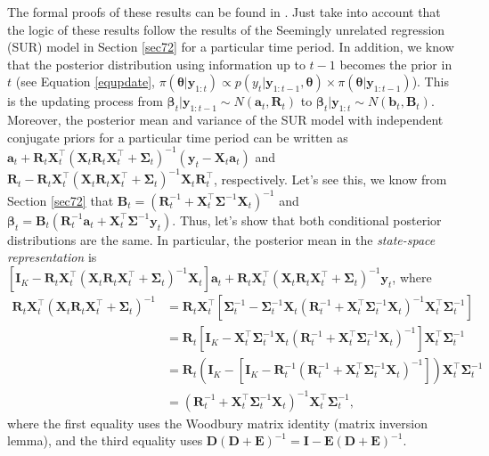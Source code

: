 The formal proofs of these results can be found in \cite[Chap~2]{petris2009dynamic}. Just take into account that the logic of these results follow the results of the Seemingly unrelated regression (SUR) model in Section \ref{sec72} for a particular time period. In addition, we know that the posterior distribution using information up to $t-1$ becomes the prior in $t$ (see Equation \ref{equpdate}, $\pi(\bm{\theta}|\mathbf{y}_{1:t})\propto p(y_{t}|\bm{y}_{1:t-1},\bm{\theta})\times \pi(\bm{\theta}|\bm{y}_{1:t-1})$). This is the updating process from  $\bm{\beta}_t|\bm{y}_{1:t-1}\sim N(\bm{a}_t, \bm{R}_t)$ to $\bm{\beta}_t|\bm{y}_{1:t}\sim N(\bm{b}_t, \bm{B}_t)$. Moreover, the posterior mean and variance of the SUR model with independent conjugate priors for a particular time period can be written as $\bm{a}_{t}+\bm{R}_{t}\bm{X}_t^{\top}(\bm{X}_t\bm{R}_{t}\bm{X}_t^{\top}+ \bm{\Sigma}_t)^{-1}(\bm{y}_t-\bm{X}_t\bm{a}_{t})$ and $\bm{R}_{t}-\bm{R}_{t}\bm{X}_t^{\top}(\bm{X}_t\bm{R}_{t}\bm{X}_t^{\top}+\bm{\Sigma}_t)^{-1} \bm{X}_t\bm{R}_{t}^{\top}$, respectively. Let's see this, we know from Section \ref{sec72} that $\bm{B}_t=(\bm{R}_t^{-1}+\bm{X}_t^{\top}\bm{\Sigma}^{-1}\bm{X}_t)^{-1}$ and $\bm{\beta}_t=\bm{B}_t(\bm{R}_t^{-1}\bm{a}_t+\bm{X}_t^{\top}\bm{\Sigma}^{-1}\bm{y}_t)$. Thus, let's show that both conditional posterior distributions are the same. In particular, the posterior mean in the \textit{state-space representation} is $[\bm{I}_K-\bm{R}_{t}\bm{X}_t^{\top}(\bm{X}_t\bm{R}_{t}\bm{X}_t^{\top}+ \bm{\Sigma}_t)^{-1}\bm{X}_t]\bm{a}_{t}+\bm{R}_{t}\bm{X}_t^{\top}(\bm{X}_t\bm{R}_{t}\bm{X}_t^{\top}+ \bm{\Sigma}_t)^{-1}\bm{y}_t$, where 
\begin{align*}
	\bm{R}_{t}\bm{X}_t^{\top}(\bm{X}_t\bm{R}_{t}\bm{X}_t^{\top}+ \bm{\Sigma}_t)^{-1}
	&=\bm{R}_{t}\bm{X}_t^{\top}[\bm{\Sigma}_t^{-1}-\bm{\Sigma}_t^{-1}\bm{X}_t(\bm{R}_t^{-1}+\bm{X}_t^{\top}\bm{\Sigma}_t^{-1}\bm{X}_t)^{-1}\bm{X}_t^{\top}\bm{\Sigma}_t^{-1}]\\
	&=\bm{R}_{t}[\bm{I}_K-\bm{X}_t^{\top}\bm{\Sigma}_t^{-1}\bm{X}_t(\bm{R}_t^{-1}+\bm{X}_t^{\top}\bm{\Sigma}_t^{-1}\bm{X}_t)^{-1}]\bm{X}_t^{\top}\bm{\Sigma}_t^{-1}\\
	&=\bm{R}_{t}(\bm{I}_K-[\bm{I}_K-\bm{R}_t^{-1}(\bm{R}_t^{-1}+\bm{X}_t^{\top}\bm{\Sigma}_t^{-1}\bm{X}_t)^{-1}])\bm{X}_t^{\top}\bm{\Sigma}_t^{-1}\\
	&=(\bm{R}_t^{-1}+\bm{X}_t^{\top}\bm{\Sigma}_t^{-1}\bm{X}_t)^{-1}\bm{X}_t^{\top}\bm{\Sigma}_t^{-1},
\end{align*}
where the first equality uses the Woodbury matrix identity (matrix inversion lemma), and the third equality uses $\bm{D}(\bm{D}+\bm{E})^{-1}=\bm{I}-\bm{E}(\bm{D}+\bm{E})^{-1}$. 

